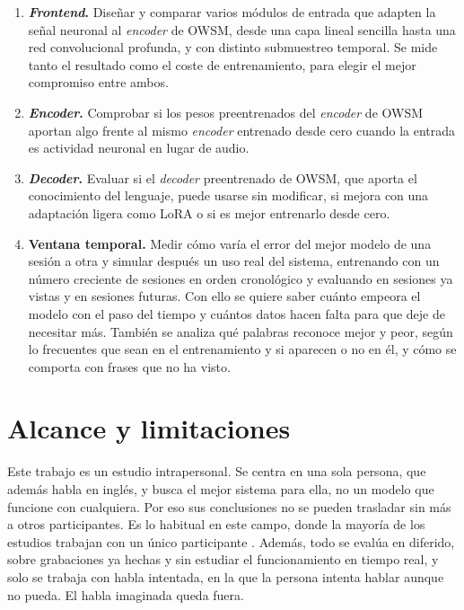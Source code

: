 \begin{enumerate}[label=\textbf{O\arabic*.}, leftmargin=*, itemsep=0.4em]

  \item \textbf{\textit{Frontend}.} Diseñar y comparar varios módulos de entrada que adapten la señal neuronal al \textit{encoder} de OWSM, desde una capa lineal sencilla hasta una red convolucional profunda, y con distinto submuestreo temporal. Se mide tanto el resultado como el coste de entrenamiento, para elegir el mejor compromiso entre ambos.

  \item \textbf{\textit{Encoder}.} Comprobar si los pesos preentrenados del \textit{encoder} de OWSM aportan algo frente al mismo \textit{encoder} entrenado desde cero cuando la entrada es actividad neuronal en lugar de audio.

  \item \textbf{\textit{Decoder}.} Evaluar si el \textit{decoder} preentrenado de OWSM, que aporta el conocimiento del lenguaje, puede usarse sin modificar, si mejora con una adaptación ligera como LoRA \cite{hu2022lora} o si es mejor entrenarlo desde cero.

 \item \textbf{Ventana temporal.} Medir cómo varía el error del mejor modelo de una sesión a otra y simular después un uso real del sistema, entrenando con un número creciente de sesiones en orden cronológico y evaluando en sesiones ya vistas y en sesiones futuras. Con ello se quiere saber cuánto empeora el modelo con el paso del tiempo y cuántos datos hacen falta para que deje de necesitar más. También se analiza qué palabras reconoce mejor y peor, según lo frecuentes que sean en el entrenamiento y si aparecen o no en él, y cómo se comporta con frases que no ha visto.

\end{enumerate}

\section{Alcance y limitaciones}
\label{sec:alcance}

Este trabajo es un estudio intrapersonal. Se centra en una sola persona, que además habla en inglés, y busca el mejor sistema para ella, no un modelo que funcione con cualquiera. Por eso sus conclusiones no se pueden trasladar sin más a otros participantes. Es lo habitual en este campo, donde la mayoría de los estudios trabajan con un único participante \cite{willett2023,card2024}. Además, todo se evalúa en diferido, sobre grabaciones ya hechas y sin estudiar el funcionamiento en tiempo real, y solo se trabaja con habla intentada, en la que la persona intenta hablar aunque no pueda. El habla imaginada queda fuera.

